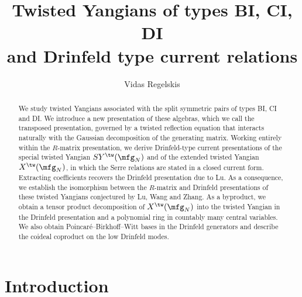 \documentclass{amsart}
\numberwithin{equation}{section}
\theoremstyle{remark}
\renewcommand{\,}{\kern 0.1em} %
\begin{document}
\title[Twisted Yangians of types BI, CI, DI]{Twisted Yangians of types BI, CI, DI \\ and Drinfeld type current relations}

\author{Vidas Regelskis}
\address{Department of Physics, Astronomy and Mathematics, University of Hertfordshire, 
Hatfield AL10 9AB, UK and
Institute of Theoretical Physics and Astronomy, Vilnius University, Saul\.etekio av.~3, Vilnius 10257, Lithuania.}

	
	
\begin{abstract}
We study twisted Yangians associated with the split symmetric pairs of types BI, CI and DI. We introduce a new presentation of these algebras, which we call the transposed presentation, governed by a twisted reflection equation that interacts naturally with the Gaussian decomposition of the generating matrix. Working entirely within the $R$-matrix presentation, we derive Drinfeld-type current presentations of the special twisted Yangian $SY^{\tw}(\mfg_N)$ and of the extended twisted Yangian $X^{\tw}(\mfg_N)$, in which the Serre relations are stated in a closed current form. Extracting coefficients recovers the Drinfeld presentation due to Lu. As a consequence, we establish the isomorphism between the $R$-matrix and Drinfeld presentations of these twisted Yangians conjectured by Lu, Wang and Zhang. As a byproduct, we obtain a tensor product decomposition of $X^{\tw}(\mfg_N)$ into the twisted Yangian in the Drinfeld presentation and a polynomial ring in countably many central variables. We also obtain Poincar\'e--Birkhoff--Witt bases in the Drinfeld generators and describe the coideal coproduct on the low Drinfeld modes.
\end{abstract}
	
	

\maketitle
\setcounter{tocdepth}{1}
\tableofcontents
\setcounter{tocdepth}{2} 


\setlength{\medmuskip}{2.0mu plus 1.0mu minus 1.0mu} 


\section{Introduction} \label{sec:into}
\end{document}
